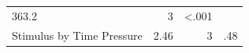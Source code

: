 \documentclass[11pt,]{article}
\begin{document}
\begin{longtable}[]{@{}lrrr@{}}
\begin{minipage}[t]{0.16\columnwidth}
363.2\strut
\end{minipage} & \begin{minipage}[t]{0.06\columnwidth}\raggedleft\strut
3\strut
\end{minipage} & \begin{minipage}[t]{0.06\columnwidth}\raggedleft\strut
\textless{}.001\strut
\end{minipage}\tabularnewline
\begin{minipage}[t]{0.32\columnwidth}\raggedright\strut
Stimulus by Time Pressure\strut
\end{minipage} & \begin{minipage}[t]{0.16\columnwidth}\raggedleft\strut
2.46\strut
\end{minipage} & \begin{minipage}[t]{0.06\columnwidth}\raggedleft\strut
3\strut
\end{minipage} & \begin{minipage}[t]{0.06\columnwidth}\raggedleft\strut
.48\strut
\end{minipage}\tabularnewline
\bottomrule
\end{longtable}
\end{document}
